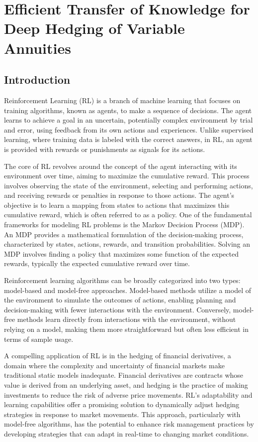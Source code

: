 \chapter{Efficient Transfer of Knowledge for Deep Hedging of Variable Annuities}

\section{Introduction}

Reinforcement Learning (RL) is a branch of machine learning that focuses on training algorithms, known as agents, to make a sequence of decisions. 
The agent learns to achieve a goal in an uncertain, potentially complex environment by trial and error, using feedback from its own actions and experiences. 
Unlike supervised learning, where training data is labeled with the correct answers, in RL, an agent is provided with rewards or punishments as signals for its actions.

The core of RL revolves around the concept of the agent interacting with its environment over time, aiming to maximize the cumulative reward. 
This process involves observing the state of the environment, selecting and performing actions, and receiving rewards or penalties in response to those actions. 
The agent's objective is to learn a mapping from states to actions that maximizes this cumulative reward, which is often referred to as a policy. 
One of the fundamental frameworks for modeling RL problems is the Markov Decision Process (MDP). 
An MDP provides a mathematical formulation of the decision-making process, characterized by states, actions, rewards, and transition probabilities. Solving an MDP involves finding a policy that maximizes some function of the expected rewards, typically the expected cumulative reward over time.

Reinforcement learning algorithms can be broadly categorized into two types: model-based and model-free approaches. 
Model-based methods utilize a model of the environment to simulate the outcomes of actions, enabling planning and decision-making with fewer interactions with the environment. 
Conversely, model-free methods learn directly from interactions with the environment, without relying on a model, making them more straightforward but often less efficient in terms of sample usage.

A compelling application of RL is in the hedging of financial derivatives, a domain where the complexity and uncertainty of financial markets make traditional static models inadequate.
Financial derivatives are contracts whose value is derived from an underlying asset, and hedging is the practice of making investments to reduce the risk of adverse price movements.
RL's adaptability and learning capabilities offer a promising solution to dynamically adjust hedging strategies in response to market movements.
This approach, particularly with model-free algorithms, has the potential to enhance risk management practices by developing strategies that can adapt in real-time to changing market conditions.

